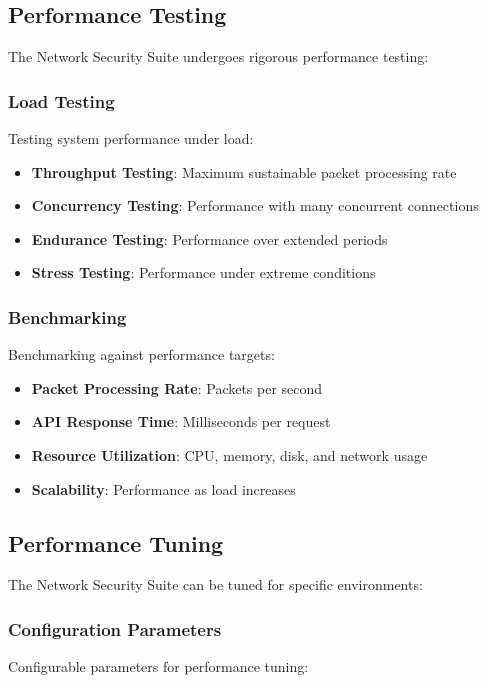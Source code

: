 \subsection{Performance Testing}
The Network Security Suite undergoes rigorous performance testing:

\subsubsection{Load Testing}
Testing system performance under load:

\begin{itemize}
    \item \textbf{Throughput Testing}: Maximum sustainable packet processing rate
    \item \textbf{Concurrency Testing}: Performance with many concurrent connections
    \item \textbf{Endurance Testing}: Performance over extended periods
    \item \textbf{Stress Testing}: Performance under extreme conditions
\end{itemize}

\subsubsection{Benchmarking}
Benchmarking against performance targets:

\begin{itemize}
    \item \textbf{Packet Processing Rate}: Packets per second
    \item \textbf{API Response Time}: Milliseconds per request
    \item \textbf{Resource Utilization}: CPU, memory, disk, and network usage
    \item \textbf{Scalability}: Performance as load increases
\end{itemize}

\subsection{Performance Tuning}
The Network Security Suite can be tuned for specific environments:

\subsubsection{Configuration Parameters}
Configurable parameters for performance tuning:

